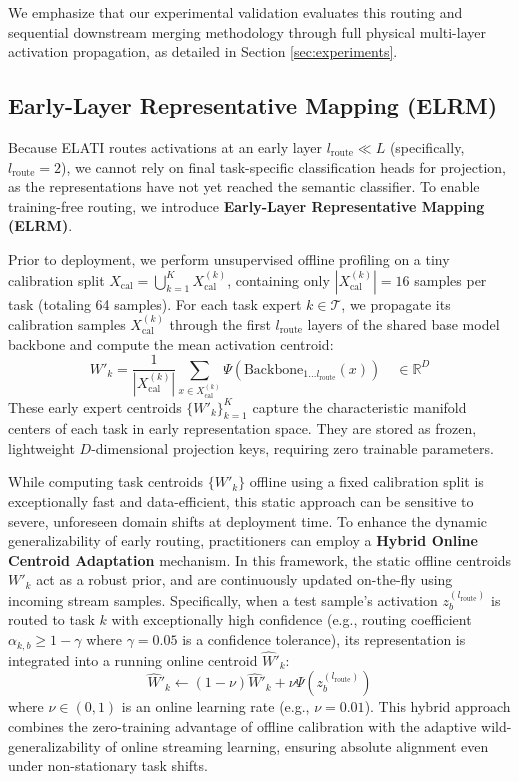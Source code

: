 We emphasize that our experimental validation evaluates this routing and sequential downstream merging methodology through full physical multi-layer activation propagation, as detailed in Section \ref{sec:experiments}.

\subsection{Early-Layer Representative Mapping (ELRM)}
Because ELATI routes activations at an early layer $l_{\text{route}} \ll L$ (specifically, $l_{\text{route}} = 2$), we cannot rely on final task-specific classification heads for projection, as the representations have not yet reached the semantic classifier.
To enable training-free routing, we introduce \textbf{Early-Layer Representative Mapping (ELRM)}.

Prior to deployment, we perform unsupervised offline profiling on a tiny calibration split $X_{\text{cal}} = \bigcup_{k=1}^K X_{\text{cal}}^{(k)}$, containing only $|X_{\text{cal}}^{(k)}| = 16$ samples per task (totaling 64 samples).
For each task expert $k \in \mathcal{T}$, we propagate its calibration samples $X_{\text{cal}}^{(k)}$ through the first $l_{\text{route}}$ layers of the shared base model backbone and compute the mean activation centroid:
\begin{equation}
    W'_{k} = \frac{1}{|X_{\text{cal}}^{(k)}|} \sum_{x \in X_{\text{cal}}^{(k)}} \Psi\left(\text{Backbone}_{1 \dots l_{\text{route}}}(x)\right) \quad \in \mathbb{R}^D
\end{equation}
These early expert centroids $\{W'_k\}_{k=1}^K$ capture the characteristic manifold centers of each task in early representation space. They are stored as frozen, lightweight $D$-dimensional projection keys, requiring zero trainable parameters.

While computing task centroids $\{W'_k\}$ offline using a fixed calibration split is exceptionally fast and data-efficient, this static approach can be sensitive to severe, unforeseen domain shifts at deployment time. To enhance the dynamic generalizability of early routing, practitioners can employ a \textbf{Hybrid Online Centroid Adaptation} mechanism. In this framework, the static offline centroids $W'_k$ act as a robust prior, and are continuously updated on-the-fly using incoming stream samples. Specifically, when a test sample's activation $z_b^{(l_{\text{route}})}$ is routed to task $k$ with exceptionally high confidence (e.g., routing coefficient $\alpha_{k, b} \ge 1 - \gamma$ where $\gamma = 0.05$ is a confidence tolerance), its representation is integrated into a running online centroid $\hat{W}'_k$:
\begin{equation}
    \hat{W}'_k \leftarrow (1 - \nu) \hat{W}'_k + \nu \Psi(z_b^{(l_{\text{route}})})
\end{equation}
where $\nu \in (0, 1)$ is an online learning rate (e.g., $\nu = 0.01$). This hybrid approach combines the zero-training advantage of offline calibration with the adaptive wild-generalizability of online streaming learning, ensuring absolute alignment even under non-stationary task shifts.

